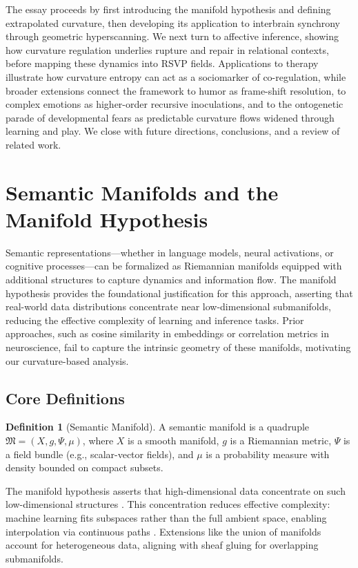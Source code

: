 \documentclass{article}
\theoremstyle{definition}
\newtheorem{definition}{Definition}[section]
\begin{document}
The essay proceeds by first introducing the manifold hypothesis and defining extrapolated curvature, then developing its application to interbrain synchrony through geometric hyperscanning. We next turn to affective inference, showing how curvature regulation underlies rupture and repair in relational contexts, before mapping these dynamics into RSVP fields. Applications to therapy illustrate how curvature entropy can act as a sociomarker of co-regulation, while broader extensions connect the framework to humor as frame-shift resolution, to complex emotions as higher-order recursive inoculations, and to the ontogenetic parade of developmental fears as predictable curvature flows widened through learning and play. We close with future directions, conclusions, and a review of related work.

\section{Semantic Manifolds and the Manifold Hypothesis}

Semantic representations—whether in language models, neural activations, or cognitive processes—can be formalized as Riemannian manifolds equipped with additional structures to capture dynamics and information flow. The manifold hypothesis provides the foundational justification for this approach, asserting that real-world data distributions concentrate near low-dimensional submanifolds, reducing the effective complexity of learning and inference tasks. Prior approaches, such as cosine similarity in embeddings or correlation metrics in neuroscience, fail to capture the intrinsic geometry of these manifolds, motivating our curvature-based analysis.

\subsection{Core Definitions}

\begin{definition}[Semantic Manifold]
A semantic manifold is a quadruple $\mathfrak{M} = (X, g, \Psi, \mu)$, where $X$ is a smooth manifold, $g$ is a Riemannian metric, $\Psi$ is a field bundle (e.g., scalar-vector fields), and $\mu$ is a probability measure with density bounded on compact subsets.
\end{definition}

The manifold hypothesis asserts that high-dimensional data concentrate on such low-dimensional structures \cite{fefferman2016testing,gorban2018blessing}. This concentration reduces effective complexity: machine learning fits subspaces rather than the full ambient space, enabling interpolation via continuous paths \cite{chollet2021deep}. Extensions like the union of manifolds \cite{brown2023union} account for heterogeneous data, aligning with sheaf gluing for overlapping submanifolds.
\end{document}
